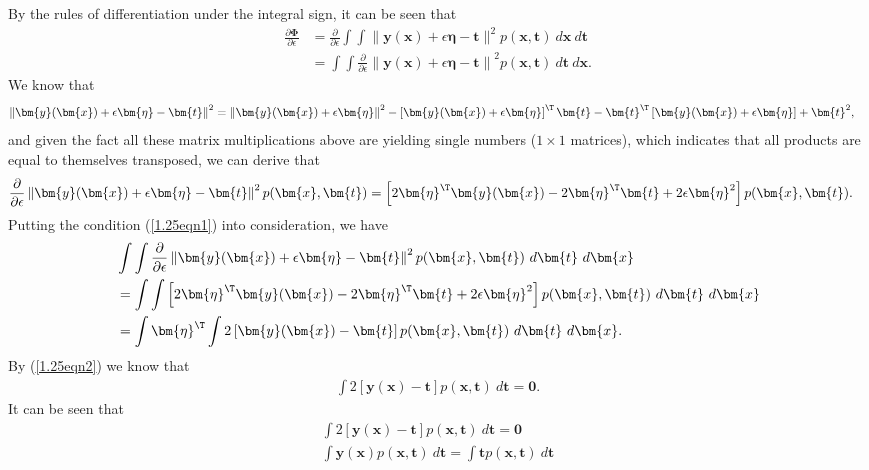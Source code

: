 \begin{answer}{}
	By the rules of differentiation under the integral sign, it can be seen that
	\begin{align}
		\frac{\partial \bm{\Phi}}{\partial \epsilon} &= \frac{\partial}{\partial \epsilon} \int\int \lVert \bm{y}(\bm{x}) + \epsilon\bm{\eta} - \bm{t} \rVert^2 p(\bm{x}, \bm{t})\ d\bm{x}\ d\bm{t}\\
		&= \int\int \frac{\partial}{\partial \epsilon}\left\lVert \bm{y}(\bm{x}) + \epsilon\bm{\eta} - \bm{t} \right\rVert^2 p(\bm{x}, \bm{t})\ d\bm{t}\ d\bm{x}.
	\end{align}
	We know that
	\begin{align}
		\left\lVert \bm{y}(\bm{x}) + \epsilon\bm{\eta} - \bm{t} \right\rVert^2 &= \left\lVert \bm{y}(\bm{x}) + \epsilon\bm{\eta} \right\rVert^2 - \left[\bm{y}(\bm{x}) + \epsilon\bm{\eta}\right]^{\T}\bm{t} - \bm{t}^{\T}\left[\bm{y}(\bm{x}) + \epsilon\bm{\eta}\right] + \bm{t}^2,
	\end{align}
	and given the fact all these matrix multiplications above are yielding single numbers ($1 \times 1$ matrices), which indicates that all products are equal to themselves transposed, we can derive that
	\begin{align}
		\frac{\partial}{\partial \epsilon} \left\lVert \bm{y}(\bm{x}) + \epsilon\bm{\eta} - \bm{t} \right\rVert^2 p(\bm{x}, \bm{t}) &= \left[2\bm{\eta}^{\T}\bm{y}(\bm{x}) - 2\bm{\eta}^{\T}\bm{t} + 2\epsilon\bm{\eta}^2\right]p(\bm{x}, \bm{t}).
	\end{align}
	Putting the condition (\ref{1.25eqn1}) into consideration, we have
	\begin{align}
		&\int\int \frac{\partial}{\partial \epsilon}\left\lVert \bm{y}(\bm{x}) + \epsilon\bm{\eta} - \bm{t} \right\rVert^2 p(\bm{x}, \bm{t})\ d\bm{t}\ d\bm{x}\\
		&= \int\int \left[2\bm{\eta}^{\T}\bm{y}(\bm{x}) - 2\bm{\eta}^{\T}\bm{t} + 2\epsilon\bm{\eta}^2\right]p(\bm{x}, \bm{t}) \ d\bm{t}\ d\bm{x}\\
		&=  \int \bm{\eta}^{\T}\int 2\left[\bm{y}(\bm{x}) - \bm{t}\right]p(\bm{x}, \bm{t}) \ d\bm{t}\ d\bm{x}.
	\end{align}
	By (\ref{1.25eqn2}) we know that
	\begin{align}
		\int 2\left[\bm{y}(\bm{x}) - \bm{t} \right]p(\bm{x}, \bm{t})\ d\bm{t} = \bm{0}. 
	\end{align}
	It can be seen that
	\begin{gather}
		\int 2\left[\bm{y}(\bm{x}) - \bm{t} \right]p(\bm{x}, \bm{t})\ d\bm{t} = \bm{0}\\
		\int \bm{y}(\bm{x}) p(\bm{x}, \bm{t})\ d\bm{t} = \int \bm{t} p(\bm{x}, \bm{t})\ d\bm{t}\\

\end{gather}
\end{answer}
